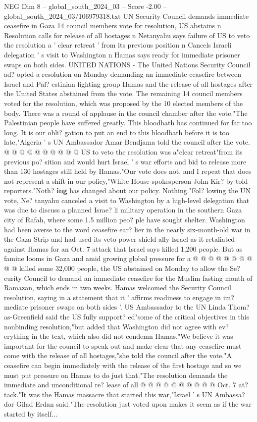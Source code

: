 \begin{textsample}{NEG Dim 8 – global\_south\_2024\_03 – Score -2.00 – global\_south\_2024\_03/106979318.txt}  \label{ex:f8_neg_025}
UN Security Council demands immediate ceasefire in Gaza 14 council members vote for resolution, US abstains n Resolution calls for release of all hostages n Netanyahu says failure of US to veto the resolution a ' clear retreat ' from its previous position n Cancels Israeli delegation ' s visit to Washington n Hamas says ready for immediate prisoner swaps on both sides.
UNITED NATIONS - The United Nations Security Council ad? opted a resolution on Monday demanding an immediate ceasefire between Israel and Pal? estinian fighting group Hamas and the release of all hostages after the United States abstained from the vote.
The remaining 14 council members voted for the resolution, which was proposed by the 10 elected members of the body.
There was a round of applause in the council chamber after the vote."The Palestinian people have suffered greatly.
This bloodbath has continued for far too long.
It is our obli? gation to put an end to this bloodbath before it is too late,"Algeria ' s UN Ambassador Amar Bendjama told the council after the vote. @ @ @ @ @ @ @ @ @ @ US to veto the resolution was a"clear retreat"from its previous po? sition and would hurt Israel ' s war efforts and bid to release more than 130 hostages still held by Hamas."Our vote does not, and I repeat that does not represent a shift in our policy,"White House spokesperson John Kir? by told reporters."Noth? \textbf{ing} has changed about our policy.
Nothing."Fol? lowing the UN vote, Ne? tanyahu canceled a visit to Washington by a high-level delegation that was due to discuss a planned Israe? li military operation in the southern Gaza city of Rafah, where some 1.5 million peo? ple have sought shelter.
Washington had been averse to the word ceasefire ear? lier in the nearly six-month-old war in the Gaza Strip and had used its veto power shield ally Israel as it retaliated against Hamas for an Oct. 7 attack that Israel says killed 1,200 people.
But as famine looms in Gaza and amid growing global pressure for a @ @ @ @ @ @ @ @ @ @ killed some 32,000 people, the US abstained on Monday to allow the Se? curity Council to demand an immediate ceasefire for the Muslim fasting month of Ramazan, which ends in two weeks.
Hamas welcomed the Security Council resolution, saying in a statement that it ' affirms readiness to engage in im? mediate prisoner swaps on both sides '.
US Ambassador to the UN Linda Thom? as-Greenfield said the US fully support? ed"some of the critical objectives in this nonbinding resolution,"but added that Washington did not agree with ev? erything in the text, which also did not condemn Hamas."We believe it was important for the council to speak out and make clear that any ceasefire must come with the release of all hostages,"she told the council after the vote."A ceasefire can begin immediately with the release of the first hostage and so we must put pressure on Hamas to do just that."The resolution demands the immediate and unconditional re? lease of all @ @ @ @ @ @ @ @ @ @ Oct. 7 at? tack."It was the Hamas massacre that started this war,"Israel ' s UN Ambassa? dor Gilad Erdan said."The resolution just voted upon makes it seem as if the war started by itself...

\end{textsample}
